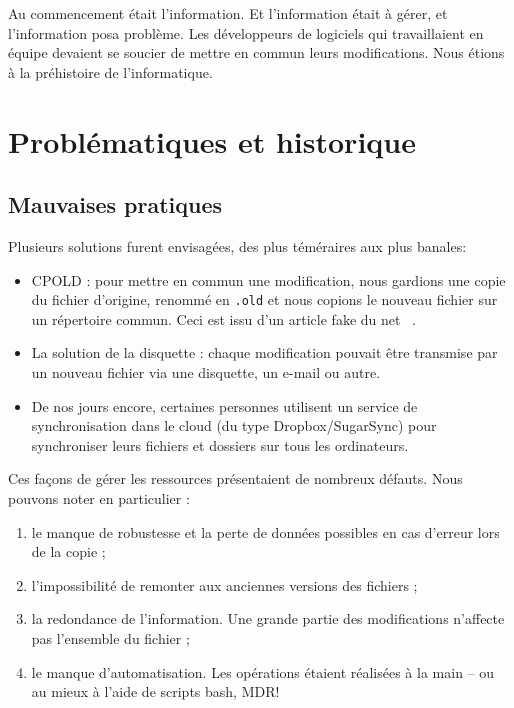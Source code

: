 
Au commencement était l'information. Et l'information était à gérer, et l'information posa problème. Les développeurs de logiciels qui travaillaient en équipe devaient se soucier de mettre en commun leurs modifications. 
Nous étions à la préhistoire de l'informatique.

\section{Problématiques et historique}

\subsection{Mauvaises pratiques}



Plusieurs solutions furent envisagées, des plus téméraires aux plus banales:
\begin{itemize}
\item CPOLD : pour mettre en commun une modification, nous gardions une copie du fichier d'origine, renommé en \texttt{.old} et nous copions le nouveau fichier sur un répertoire commun. Ceci est issu d'un article fake du net ~\cite{CPOLD-article}. 
\item La solution de la disquette : chaque modification pouvait être transmise par un nouveau fichier via une disquette, un e-mail ou autre.
\item De nos jours encore, certaines personnes utilisent un service de synchronisation dans le cloud (du type Dropbox/SugarSync) pour synchroniser leurs fichiers et dossiers sur tous les ordinateurs. 
\end{itemize}

Ces façons de gérer les ressources présentaient de nombreux défauts. Nous pouvons noter en particulier : 
\begin{enumerate}
\item le manque de robustesse et la perte de données possibles en cas d'erreur lors de la copie ;
\item l'impossibilité de remonter aux anciennes versions des fichiers ;
\item la redondance de l'information. Une grande partie des modifications n'affecte pas l'ensemble du fichier ;
\item le manque d'automatisation. Les opérations étaient réalisées à la main -- ou au mieux à l'aide de scripts bash, MDR! 
\end{enumerate}

